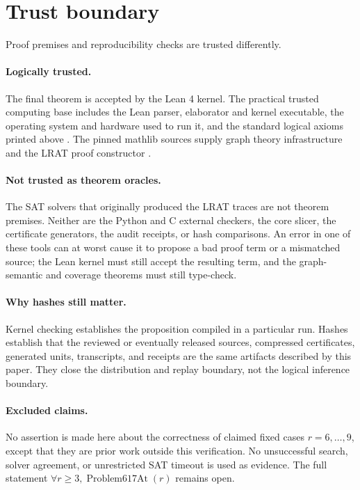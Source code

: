 \documentclass[11pt,reqno,a4paper]{amsart}
\theoremstyle{definition}
\theoremstyle{remark}
\newcommand{\ProblemAt}{\operatorname{Problem617At}}
\begin{document}
\section{Trust boundary}

Proof premises and reproducibility checks are trusted differently.

\paragraph{Logically trusted.}
The final theorem is accepted by the Lean 4 kernel.  The practical trusted
computing base includes the Lean parser, elaborator and kernel executable,
the operating system and hardware used to run it, and the standard logical
axioms printed above \cite{deMouraUllrich2021}.  The pinned mathlib sources
supply graph theory infrastructure and the LRAT proof constructor
\cite{mathlib2020}.

\paragraph{Not trusted as theorem oracles.}
The SAT solvers that originally produced the LRAT traces are not theorem
premises.  Neither are the Python and C external checkers, the core slicer,
the certificate generators, the audit receipts, or hash comparisons.  An
error in one of these tools can at worst cause it to propose a bad proof term
or a mismatched source; the Lean kernel must still accept the resulting term,
and the graph-semantic and coverage theorems must still type-check.

\paragraph{Why hashes still matter.}
Kernel checking establishes the proposition compiled in a particular run.
Hashes establish that the reviewed or eventually released sources, compressed
certificates, generated units, transcripts, and receipts are the same
artifacts described by this paper.  They close the distribution and replay
boundary, not the logical inference boundary.

\paragraph{Excluded claims.}
No assertion is made here about the correctness of claimed fixed cases
\(r=6,\ldots,9\), except that they are prior work outside this verification.
No unsuccessful search, solver agreement, or unrestricted SAT timeout is
used as evidence.  The full statement
\(\forall r\ge3,\ProblemAt(r)\) remains open.
\end{document}

